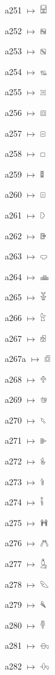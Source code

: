 {\noindent a251 $\mapsto$ {\ahfont 𔔝}\par
\noindent a252 $\mapsto$ {\ahfont 𔔞}\par
\noindent a253 $\mapsto$ {\ahfont 𔔟}\par
\noindent a254 $\mapsto$ {\ahfont 𔔠}\par
\noindent a255 $\mapsto$ {\ahfont 𔔡}\par
\noindent a256 $\mapsto$ {\ahfont 𔔢}\par
\noindent a257 $\mapsto$ {\ahfont 𔔣}\par
\noindent a258 $\mapsto$ {\ahfont 𔔤}\par
\noindent a259 $\mapsto$ {\ahfont 𔔥}\par
\noindent a260 $\mapsto$ {\ahfont 𔔦}\par
\noindent a261 $\mapsto$ {\ahfont 𔔧}\par
\noindent a262 $\mapsto$ {\ahfont 𔔨}\par
\noindent a263 $\mapsto$ {\ahfont 𔔩}\par
\noindent a264 $\mapsto$ {\ahfont 𔔪}\par
\noindent a265 $\mapsto$ {\ahfont 𔔫}\par
\noindent a266 $\mapsto$ {\ahfont 𔔬}\par
\noindent a267 $\mapsto$ {\ahfont 𔔭}\par
\noindent a267a $\mapsto$ {\ahfont 𔔮}\par
\noindent a268 $\mapsto$ {\ahfont 𔔯}\par
\noindent a269 $\mapsto$ {\ahfont 𔔰}\par
\noindent a270 $\mapsto$ {\ahfont 𔔱}\par
\noindent a271 $\mapsto$ {\ahfont 𔔲}\par
\noindent a272 $\mapsto$ {\ahfont 𔔳}\par
\noindent a273 $\mapsto$ {\ahfont 𔔴}\par
\noindent a274 $\mapsto$ {\ahfont 𔔵}\par
\noindent a275 $\mapsto$ {\ahfont 𔔶}\par
\noindent a276 $\mapsto$ {\ahfont 𔔷}\par
\noindent a277 $\mapsto$ {\ahfont 𔔸}\par
\noindent a278 $\mapsto$ {\ahfont 𔔹}\par
\noindent a279 $\mapsto$ {\ahfont 𔔺}\par
\noindent a280 $\mapsto$ {\ahfont 𔔻}\par
\noindent a281 $\mapsto$ {\ahfont 𔔼}\par
\noindent a282 $\mapsto$ {\ahfont 𔔽}\par
}
